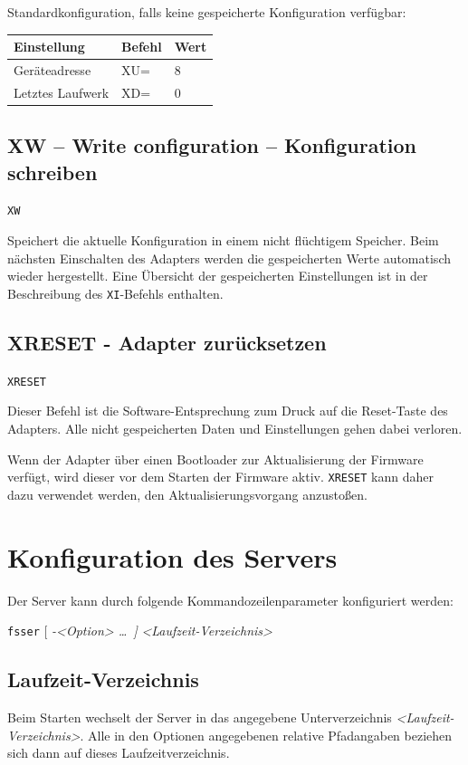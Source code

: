 \documentclass[10pt,a4paper]{scrartcl}		%
\begin{document}
Standardkonfiguration, falls keine gespeicherte Konfiguration verfügbar:

\begin{tabular}[c]{l l l}
\toprule 
Einstellung & Befehl & Wert\\
\midrule
Geräteadresse		& XU= & 8 \\
Letztes Laufwerk	& XD= & 0 \\
\bottomrule
\end{tabular}

\clearpage %
\subsection{XW -- Write configuration -- Konfiguration schreiben}

\texttt{XW}

Speichert die aktuelle Konfiguration in einem nicht flüchtigem Speicher.
Beim nächsten Einschalten des Adapters werden die gespeicherten Werte
automatisch wieder hergestellt. Eine Übersicht der gespeicherten
Einstellungen ist in der Be\-schrei\-bung des \texttt{XI}-Befehls enthalten.

\subsection{XRESET - Adapter zurücksetzen}

\texttt{XRESET}

Dieser Befehl ist die Software-Entsprechung zum Druck auf die Reset-Taste
des Adapters. Alle nicht gespeicherten Daten und Einstellungen gehen
dabei verloren.

Wenn der Adapter über einen Bootloader zur Aktualisierung der Firmware
verfügt, wird dieser vor dem Starten der Firmware aktiv. \texttt{XRESET}
kann daher dazu verwendet werden, den Aktualisierungsvorgang anzustoßen.

\clearpage
\section{Konfiguration des Servers}
Der Server kann durch folgende Kommandozeilenparameter konfiguriert 
werden:

\texttt{fsser} \Big[ \textit{-<Option> \ldots \ \Big] }
\textit{<Laufzeit-Verzeichnis>}

\subsection{Laufzeit-Verzeichnis}
Beim Starten wechselt der Server in das angegebene Unterverzeichnis
\textit{<Laufzeit-Verzeichnis>}. Alle in den Optionen angegebenen
relative Pfadangaben beziehen sich dann auf dieses Laufzeitverzeichnis.
\end{document}
